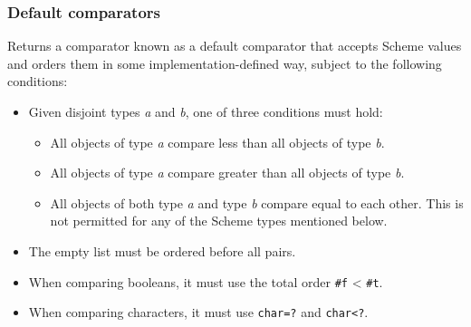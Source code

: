 \hypertarget{Defaultcomparators}{\subsubsection{Default
comparators}}

\begin{entry}{%
  }

  Returns a comparator known as a default comparator that accepts
  Scheme values and orders them in some implementation-defined way,
  subject to the following conditions:

  \begin{itemize}
  \item Given disjoint types \emph{a} and \emph{b}, one of three
    conditions must hold:

  \begin{itemize}
    \tightlist
  \item All objects of type \emph{a} compare less than all objects of
    type \emph{b}.
  \item All objects of type \emph{a} compare greater than all objects
    of type \emph{b}.
  \item All objects of both type \emph{a} and type \emph{b} compare
    equal to each other. This is not permitted for any of the Scheme
    types mentioned below.
  \end{itemize}
\item The empty list must be ordered before all pairs.
\item When comparing booleans, it must use the total order
  \texttt{\#f} < \texttt{\#t}.
\item When comparing characters, it must use \texttt{char=?} and
  \texttt{char<?}.


\end{itemize}
\end{entry}
